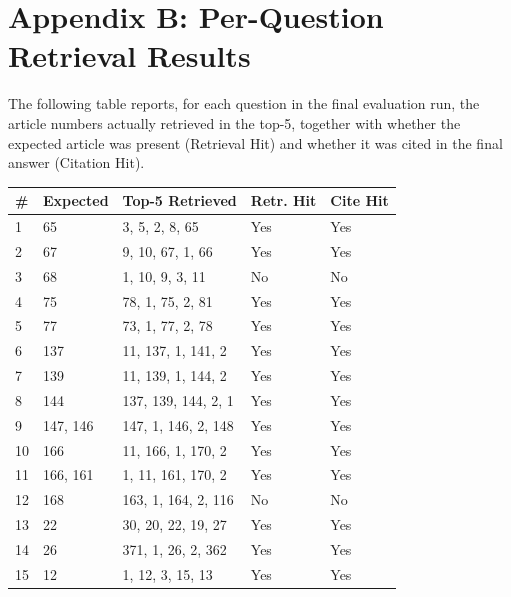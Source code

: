 \section*{Appendix B: Per-Question Retrieval Results}

\hs The following table reports, for each question in the final evaluation run, the
article numbers actually retrieved in the top-5, together with whether the expected
article was present (Retrieval Hit) and whether it was cited in the final answer
(Citation Hit).

\begin{longtable}{p{0.5cm} p{2cm} p{4.5cm} p{1.6cm} p{1.6cm}}
\toprule
\textbf{\#} & \textbf{Expected} & \textbf{Top-5 Retrieved} & \textbf{Retr. Hit} & \textbf{Cite Hit} \\
\midrule
\endhead
1  & 65       & 3, 5, 2, 8, 65        & Yes & Yes \\ \midrule
2  & 67       & 9, 10, 67, 1, 66      & Yes & Yes \\ \midrule
3  & 68       & 1, 10, 9, 3, 11       & No  & No  \\ \midrule
4  & 75       & 78, 1, 75, 2, 81      & Yes & Yes \\ \midrule
5  & 77       & 73, 1, 77, 2, 78      & Yes & Yes \\ \midrule
6  & 137      & 11, 137, 1, 141, 2    & Yes & Yes \\ \midrule
7  & 139      & 11, 139, 1, 144, 2    & Yes & Yes \\ \midrule
8  & 144      & 137, 139, 144, 2, 1   & Yes & Yes \\ \midrule
9  & 147, 146 & 147, 1, 146, 2, 148   & Yes & Yes \\ \midrule
10 & 166      & 11, 166, 1, 170, 2    & Yes & Yes \\ \midrule
11 & 166, 161 & 1, 11, 161, 170, 2    & Yes & Yes \\ \midrule
12 & 168      & 163, 1, 164, 2, 116   & No  & No  \\ \midrule
13 & 22       & 30, 20, 22, 19, 27    & Yes & Yes \\ \midrule
14 & 26       & 371, 1, 26, 2, 362    & Yes & Yes \\ \midrule
15 & 12       & 1, 12, 3, 15, 13      & Yes & Yes \\ \midrule

\end{longtable}
